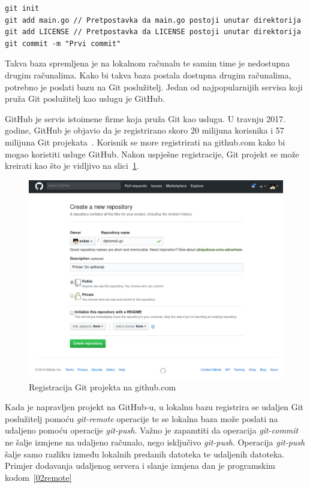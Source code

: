 \begin{lstlisting}
git init
git add main.go // Pretpostavka da main.go postoji unutar direktorija
git add LICENSE // Pretpostavka da LICENSE postoji unutar direktorija
git commit -m "Prvi commit"
\end{lstlisting}

Takva baza spremljena je na lokalnom računalu te samim time je nedostupna drugim računalima. Kako bi
takva baza postala dostupna drugim računalima, potrebno je poslati bazu na Git poslužitelj. Jedan
od najpopularnijih servisa koji pruža Git poslužitelj kao uslugu je GitHub.

GitHub je servis istoimene firme koja pruža Git kao uslugu. U travnju 2017. godine, GitHub je
objavio da je registrirano skoro 20 milijuna korisnika i 57 milijuna Git
projekata~\citep{github2017}. Korisnik se more registrirati na github.com kako bi mogao koristiti
usluge GitHub. Nakon uspješne registracije, Git projekt se može kreirati kao što je vidljivo na
slici~\ref{fig:02hgreg}.

\begin{figure}[h]
    \centering
    \includegraphics[width=0.7\linewidth]{img/02/gh.png}
    \caption{Registracija Git projekta na github.com}%
    \label{fig:02hgreg}
\end{figure}

Kada je napravljen projekt na GitHub-u, u lokalnu bazu registrira se udaljen Git poslužitelj pomoću
\textit{git-remote} operacije te se lokalna baza može poslati na udaljeno pomoću operacije
\textit{git-push}. Važno je zapamtiti da operacija \textit{git-commit} ne šalje izmjene na udaljeno
računalo, nego isključivo \textit{git-push}.  Operacija \textit{git-push} šalje samo razliku između
lokalnih predanih datoteka te udaljenih datoteka.  Primjer dodavanja udaljenog servera i slanje
izmjena dan je programskim kodom~\ref{02remote}

